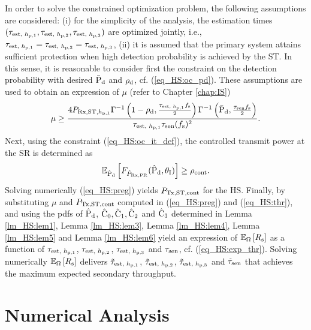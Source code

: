 \begin{IEEEproof}
In order to solve the constrained optimization problem, the following assumptions are considered: (i) for the simplicity of the analysis, the estimation times $(\tau_{\text{est, $h_{\text{p,1}}$}}, \tau_{\text{est, $h_{\text{p,2}}$}}, \tau_{\text{est, $h_{\text{p,3}}$}})$ are optimized jointly, i.e., $\tau_{\text{est, $h_{\text{p,1}}$}} = \tau_{\text{est, $h_{\text{p,2}}$}} = \tau_{\text{est, $h_{\text{p,3}}$}}$, (ii) it is assumed that the primary system attains sufficient protection when high detection probability is achieved by the ST. In this sense, it is reasonable to consider first the constraint on the detection probability with desired $\bar{\text{P}}_{\text{d}}$ and $\rho_{\text{d}}$, cf. (\ref{eq_HS:oc_pd}). These assumptions are used to obtain an expression of $\mu$ (refer to Chapter \ref{chap:IS}) 
\begin{align}
\mu \ge \frac{4 P_{\text{Rx,ST,$h_{\text{p,1}}$}} \Gamma^{-1} \left(1 - \rho_{\text{d}}, \frac{\tau_{\text{est, $h_{\text{p,1}}$}} f_{\text{s}}}{2}\right) \Gamma^{-1} \left(\bar{\text{P}}_{\text{d}}, \frac{\tau_{\text{sen}} f_{\text{s}}}{2}\right)}{ \tau_{\text{est, $h_{\text{p,1}}$}} \tau_{\text{sen}} (f_{\text{s}})^2  }. 
\label{eq_HS:thr}
\end{align}
Next, using the constraint (\ref{eq_HS:oc_it_def}), the controlled transmit power at the SR is determined as  
\begin{align}
\e{\epd}{\fprcvdpr(\epd, \ite)} \ge \opc.%
\label{eq_HS:preg}
\end{align}
Solving numerically (\ref{eq_HS:preg}) yields $P_{\text{Tx,ST,cont}}$ for the HS.
Finally, by substituting $\mu$ and $P_{\text{Tx,ST,cont}}$ computed in (\ref{eq_HS:preg}) and (\ref{eq_HS:thr}), and using the pdfs of $\hat{\text{P}}_{\text{d}}$, $\hat{\text{C}}_{\text{0}}, \hat{\text{C}}_{\text{1}}, \hat{\text{C}}_{\text{2}}$ and $\hat{\text{C}}_{\text{3}}$ determined in Lemma \ref{lm_HS:lem1}, Lemma \ref{lm_HS:lem3}, Lemma \ref{lm_HS:lem4}, Lemma \ref{lm_HS:lem5} and Lemma \ref{lm_HS:lem6} yield an expression of ${\mathbb E}_{\Omega}\left[ R_{\text{s}} \right]$ as a function of $\tau_{\text{est, $h_{\text{p,1}}$}}$, $\tau_{\text{est, $h_{\text{p,2}}$}}$, $\tau_{\text{est, $h_{\text{p,3}}$}}$ and $\tau_{\text{sen}}$, cf. (\ref{eq_HS:exp_thr}). Solving numerically ${\mathbb E}_{\Omega}\left[ R_{\text{s}} \right]$ delivers $\tilde{\tau}_{\text{est, $h_{\text{p,1}}$}}$, $\tilde{\tau}_{\text{est, $h_{\text{p,2}}$}}$, $\tilde{\tau}_{\text{est, $h_{\text{p,3}}$}}$ and $\tilde{\tau}_{\text{sen}}$ that achieves the maximum expected secondary throughput.  
\end{IEEEproof}
\section{Numerical Analysis} \label{sec:num_ana}

